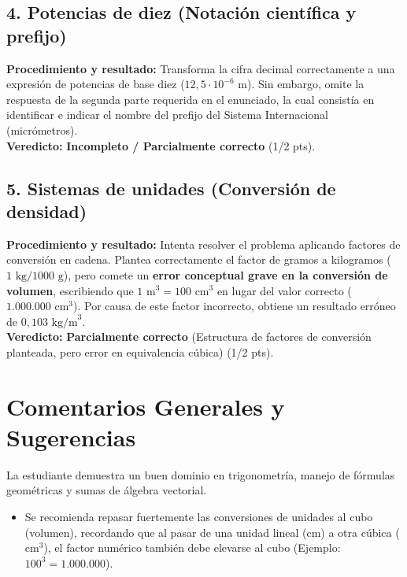 \documentclass[12pt]{article}
\begin{document}
\subsection*{4. Potencias de diez (Notación científica y prefijo)}
\textbf{Procedimiento y resultado:} Transforma la cifra decimal correctamente a una expresión de potencias de base diez ($12,5 \cdot 10^{-6}$ m). Sin embargo, omite la respuesta de la segunda parte requerida en el enunciado, la cual consistía en identificar e indicar el nombre del prefijo del Sistema Internacional (micrómetros). \\
\textbf{Veredicto:} \textbf{Incompleto / Parcialmente correcto} (1/2 pts).

\subsection*{5. Sistemas de unidades (Conversión de densidad)}
\textbf{Procedimiento y resultado:} Intenta resolver el problema aplicando factores de conversión en cadena. Plantea correctamente el factor de gramos a kilogramos ($1 \text{ kg} / 1000 \text{ g}$), pero comete un \textbf{error conceptual grave en la conversión de volumen}, escribiendo que $1 \text{ m}^3 = 100 \text{ cm}^3$ en lugar del valor correcto ($1.000.000 \text{ cm}^3$). Por causa de este factor incorrecto, obtiene un resultado erróneo de $0,103 \text{ kg/m}^3$. \\
\textbf{Veredicto:} \textbf{Parcialmente correcto} (Estructura de factores de conversión planteada, pero error en equivalencia cúbica) (1/2 pts).

\vspace{0.5cm}
\section*{Comentarios Generales y Sugerencias}
La estudiante demuestra un buen dominio en trigonometría, manejo de fórmulas geométricas y sumas de álgebra vectorial. 
\begin{itemize}
    \item Se recomienda repasar fuertemente las conversiones de unidades al cubo (volumen), recordando que al pasar de una unidad lineal (cm) a otra cúbica ($\text{cm}^3$), el factor numérico también debe elevarse al cubo (Ejemplo: $100^3 = 1.000.000$).
\end{itemize}
\end{document}
